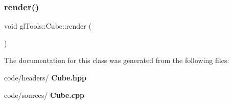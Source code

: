 \subsubsection{render()}
{\footnotesize\ttfamily void gl\+Tools\+::\+Cube\+::render (\begin{DoxyParamCaption}{ }\end{DoxyParamCaption})}



The documentation for this class was generated from the following files\+:\begin{DoxyCompactItemize}
\item 
code/headers/\textbf{ Cube.\+hpp}\item 
code/sources/\textbf{ Cube.\+cpp}\end{DoxyCompactItemize}

